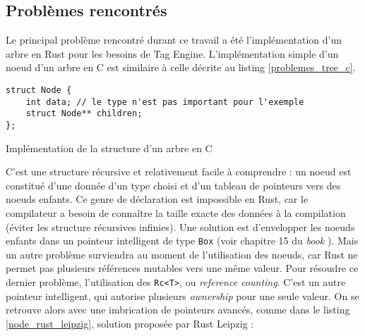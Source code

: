 \subsection{Problèmes rencontrés}\label{problemes}
Le principal problème rencontré durant ce travail a été l'implémentation d'un arbre en Rust pour 
les besoins de Tag Engine. L'implémentation simple d'un noeud d'un arbre en C est similaire à celle 
décrite au listing \ref{problemes_tree_c}.
\bigbreak
\begin{code}
    \begin{verbatim}
struct Node {
    int data; // le type n'est pas important pour l'exemple
    struct Node** children;
};
    \end{verbatim}
    \caption{Implémentation de la structure d'un arbre en C}
    \label{problemes_tree_c}
\end{code}
\bigbreak
C'est une structure récursive et relativement facile à comprendre : un noeud est constitué d'une 
donnée d'un type choisi et d'un tableau de pointeurs vers des noeuds enfants. Ce genre de déclaration 
est impossible en Rust, car le compilateur a besoin de connaître la taille exacte des données à la 
compilation (éviter les structure récursives infinies). Une solution est d'envelopper les noeuds 
enfants dans un pointeur intelligent de type \texttt{Box} (voir chapitre 15 du 
\textit{book} \cite{ref0}). Mais un autre problème surviendra au moment de l'utilisation des noeuds, 
car Rust ne permet pas plusieurs références mutables vers une même valeur. Pour résoudre ce dernier 
problème, l'utilisation des \texttt{Rc<T>}, ou \textit{reference counting}. C'est un autre 
pointeur intelligent, qui autorise plusieurs \textit{ownership} pour une seule valeur. On se 
retrouve alors avec une imbrication de pointeurs avancés, comme dans le listing \ref{node_rust_leipzig}, 
solution proposée par Rust Leipzig \cite{ref49} :
\bigbreak
